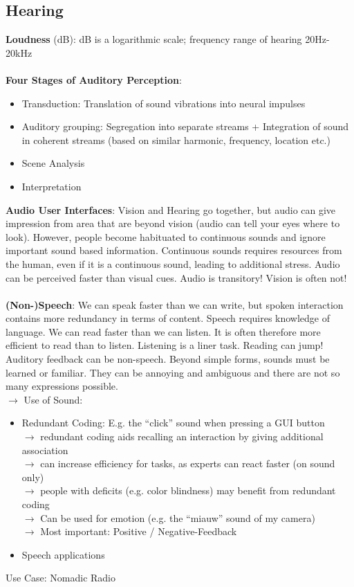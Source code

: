 \subsection{Hearing}
\textbf{Loudness} (dB): dB is a logarithmic scale; frequency range of hearing 20Hz-20kHz\\\\
\textbf{Four Stages of Auditory Perception}:
\begin{itemize}
\item Transduction: Translation of sound vibrations into neural impulses
\item Auditory grouping: Segregation into separate streams + Integration of sound in coherent streams (based on similar harmonic, frequency, location etc.)
\item Scene Analysis
\item Interpretation
\end{itemize}
\textbf{Audio User Interfaces}: Vision and Hearing go together, but audio can give impression from area that are beyond vision (audio can tell your eyes where to look). However, people become habituated to continuous sounds and ignore important sound based information. Continuous sounds requires resources from the human, even if it is a continuous sound, leading to additional stress. Audio can be perceived faster than visual cues. Audio is transitory! Vision is often not!\\\\
\textbf{(Non-)Speech}: We can speak faster than we can write, but spoken interaction contains more redundancy in terms of content. Speech requires knowledge of language. We can read faster than we can listen. It is often therefore more efficient to read than to listen. Listening is a liner task. Reading can jump! Auditory feedback can be non-speech. Beyond simple forms, sounds must be learned or familiar. They can be annoying and ambiguous and there are not so many expressions possible.\\
$\rightarrow$ Use of Sound:
\begin{itemize}
\item Redundant Coding: E.g. the ``click'' sound when pressing a GUI button\\
$\rightarrow$ redundant coding aids recalling an interaction by giving additional association\\
$\rightarrow$ can increase efficiency for tasks, as experts can react faster (on sound only)\\
$\rightarrow$ people with deficits (e.g. color blindness) may benefit from redundant coding\\
$\rightarrow$ Can be used for emotion (e.g. the ``miauw'' sound of my camera)\\
$\rightarrow$ Most important: Positive / Negative-Feedback
\item Speech applications
\end{itemize}
Use Case: Nomadic Radio	